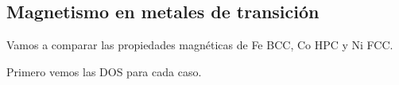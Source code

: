 \subsection{Magnetismo en metales de transición}

  Vamos a comparar las propiedades magnéticas de Fe BCC, Co HPC y Ni FCC.

  Primero vemos las DOS para cada caso.
  \begin{figure}[H]
      \centering

\end{figure}
